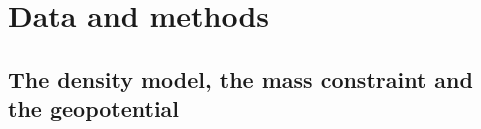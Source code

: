 %
%
%
%
%

\section{Data and methods}
\label{sec:methods}

\subsection{The density model, the mass constraint and the geopotential}
\label{sec:methods:model}

